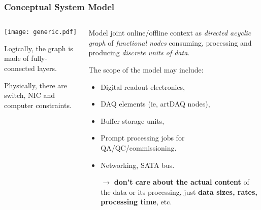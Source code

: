 \documentclass[xcolor=dvipsnames]{beamer}
\begin{document}
\begin{frame}[fragile]
  \frametitle{Conceptual System Model}


  \begin{columns}
    \begin{column}{0.4\textwidth}
      \texttt{[image: generic.pdf]}      

      \scriptsize 

      Logically, the graph is made of fully-connected layers.

      Physically, there are switch, NIC and computer constraints.

    \end{column}
    \begin{column}{0.6\textwidth}
      \footnotesize
      Model joint online/offline context as \textit{directed acyclic graph} of
      \textit{functional nodes} consuming, processing and producing \textit{discrete units of data}.
      \normalsize
      \vspace{2mm}

      The scope of the model may include:
      \begin{itemize}\footnotesize
      \item Digital readout electronics,
      \item DAQ elements (ie, artDAQ nodes),
      \item Buffer storage units,
      \item Prompt processing jobs for QA/QC/commissioning.
      \item Networking, SATA bus.
      \item[$\rightarrow$] \textbf{don't care about the actual content} of the data
        or its processing, just \textbf{data sizes, rates, processing time}, etc.
      \end{itemize}
      
    \end{column}
  \end{columns}


\end{frame}
\end{document}
